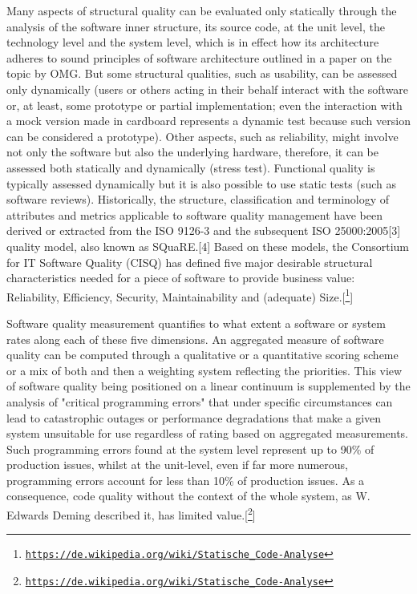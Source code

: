 Many aspects of structural quality can be evaluated only statically through the analysis of the software inner structure, its source code, at the unit level, the technology level and the system level, which is in effect how its architecture adheres to sound principles of software architecture outlined in a paper on the topic by OMG. But some structural qualities, such as usability, can be assessed only dynamically (users or others acting in their behalf interact with the software or, at least, some prototype or partial implementation; even the interaction with a mock version made in cardboard represents a dynamic test because such version can be considered a prototype). Other aspects, such as reliability, might involve not only the software but also the underlying hardware, therefore, it can be assessed both statically and dynamically (stress test).
Functional quality is typically assessed dynamically but it is also possible to use static tests (such as software reviews).
Historically, the structure, classification and terminology of attributes and metrics applicable to software quality management have been derived or extracted from the ISO 9126-3 and the subsequent ISO 25000:2005[3] quality model, also known as SQuaRE.[4] Based on these models, the Consortium for IT Software Quality (CISQ) has defined five major desirable structural characteristics needed for a piece of software to provide business value: Reliability, Efficiency, Security, Maintainability and (adequate) Size.[\footnote{\href{https://de.wikipedia.org/wiki/Statische\_Code-Analyse}{\texttt{https://de.wikipedia.org/wiki/Statische\_Code-Analyse}}}]
\newline


Software quality measurement quantifies to what extent a software or system rates along each of these five dimensions. An aggregated measure of software quality can be computed through a qualitative or a quantitative scoring scheme or a mix of both and then a weighting system reflecting the priorities. This view of software quality being positioned on a linear continuum is supplemented by the analysis of "critical programming errors" that under specific circumstances can lead to catastrophic outages or performance degradations that make a given system unsuitable for use regardless of rating based on aggregated measurements. Such programming errors found at the system level represent up to 90\% of production issues, whilst at the unit-level, even if far more numerous, programming errors account for less than 10\% of production issues. As a consequence, code quality without the context of the whole system, as W. Edwards Deming described it, has limited value.[\footnote{\href{https://de.wikipedia.org/wiki/Statische\_Code-Analyse}{\texttt{https://de.wikipedia.org/wiki/Statische\_Code-Analyse}}}]
\newline
 
